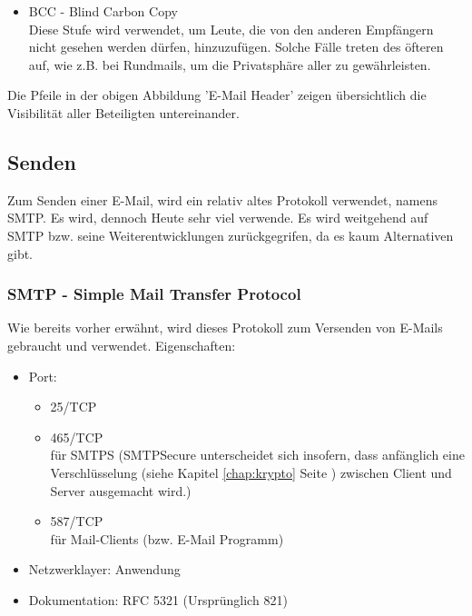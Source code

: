 \documentclass[12pt,a4paper]{report}
\begin{document}
\begin{onehalfspace}
\begin{itemize}
\item BCC - Blind Carbon Copy\\
Diese Stufe wird verwendet, um Leute, die von den anderen Empfängern nicht gesehen werden dürfen, hinzuzufügen. Solche Fälle treten des öfteren auf, wie z.B. bei Rundmails, um die Privatsphäre aller zu gewährleisten.
\end{itemize}  
Die Pfeile in der obigen Abbildung 'E-Mail Header' zeigen übersichtlich die Visibilität aller Beteiligten untereinander.
\subsection{Senden}
Zum Senden einer E-Mail, wird ein relativ altes Protokoll verwendet, namens SMTP. Es wird, dennoch Heute sehr viel verwende. Es wird weitgehend auf SMTP bzw. seine Weiterentwicklungen zurückgegrifen, da es kaum Alternativen gibt.
\subsubsection{SMTP - Simple Mail Transfer Protocol}
Wie bereits vorher erwähnt, wird dieses Protokoll zum Versenden von E-Mails gebraucht und verwendet. 
Eigenschaften:\\
\begin{itemize}
\item Port:
\begin{itemize}
\item 25/TCP
\item 465/TCP\\
für SMTPS (SMTPSecure unterscheidet sich insofern, dass anfänglich eine Verschlüsselung (siehe Kapitel \ref{chap:krypto} Seite \pageref{chap:krypto}) zwischen Client und Server ausgemacht wird.)
\item 587/TCP\\
für Mail-Clients (bzw. E-Mail Programm)
\end{itemize}
\item Netzwerklayer: Anwendung
\item Dokumentation: RFC 5321 (Ursprünglich 821)
\end{itemize}

\end{onehalfspace}
\end{document}
